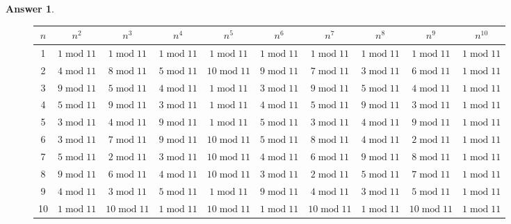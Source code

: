 \documentclass[article, 12pt]{article}
\theoremstyle{definition}
\newtheorem{answer}{Answer}
\newcommand{\Mod}[1]{\;\mathrm{mod}\; #1} %
\begin{document}
\begin{answer}
\begin{figure}[H]
{\begin{tabular}{|c|c|c|c|c|c|c|c|c|c|}
                $n$ & $n^2$ & $n^3$ & $n^4$ & $n^5$ & $n^6$ & $n^7$ & $n^8$ & $n^9$ & $n^{10}$ \\
                \hline
                1 & $1 \Mod {11}$ & $1 \Mod {11}$ & $1 \Mod {11}$ & $1 \Mod {11}$ & $1 \Mod {11}$ & $1 \Mod {11}$ & $1 \Mod {11}$ & $1 \Mod {11}$ & $1 \Mod {11}$ \\
                2 & $4 \Mod {11}$ & $8 \Mod {11}$ & $5 \Mod {11}$ & $10 \Mod {11}$ & $9 \Mod {11}$ & $7 \Mod {11}$ & $3 \Mod {11}$ & $6 \Mod {11}$ & $1 \Mod {11}$ \\
                3 & $9 \Mod {11}$ & $5 \Mod {11}$ & $4 \Mod {11}$ & $1 \Mod {11}$ & $3 \Mod {11}$ & $9 \Mod {11}$ & $5 \Mod {11}$ & $4 \Mod {11}$ & $1 \Mod {11}$ \\
                4 & $5 \Mod {11}$ & $9 \Mod {11}$ & $3 \Mod {11}$ & $1 \Mod {11}$ & $4 \Mod {11}$ & $5 \Mod {11}$ & $9 \Mod {11}$ & $3 \Mod {11}$ & $1 \Mod {11}$ \\
                5 & $3 \Mod {11}$ & $4 \Mod {11}$ & $9 \Mod {11}$ & $1 \Mod {11}$ & $5 \Mod {11}$ & $3 \Mod {11}$ & $4 \Mod {11}$ & $9 \Mod {11}$ & $1 \Mod {11}$ \\
                6 & $3 \Mod {11}$ & $7 \Mod {11}$ & $9 \Mod {11}$ & $10 \Mod {11}$ & $5 \Mod {11}$ & $8 \Mod {11}$ & $4 \Mod {11}$ & $2 \Mod {11}$ & $1 \Mod {11}$ \\
                7 & $5 \Mod {11}$ & $2 \Mod {11}$ & $3 \Mod {11}$ & $10 \Mod {11}$ & $4 \Mod {11}$ & $6 \Mod {11}$ & $9 \Mod {11}$ & $8 \Mod {11}$ & $1 \Mod {11}$ \\
                8 & $9 \Mod {11}$ & $6 \Mod {11}$ & $4 \Mod {11}$ & $10 \Mod {11}$ & $3 \Mod {11}$ & $2 \Mod {11}$ & $5 \Mod {11}$ & $7 \Mod {11}$ & $1 \Mod {11}$ \\
                9 & $4 \Mod {11}$ & $3 \Mod {11}$ & $5 \Mod {11}$ & $1 \Mod {11}$ & $9 \Mod {11}$ & $4 \Mod {11}$ & $3 \Mod {11}$ & $5 \Mod {11}$ & $1 \Mod {11}$ \\
                10 & $1 \Mod {11}$ & $10 \Mod {11}$ & $1 \Mod {11}$ & $10 \Mod {11}$ & $1 \Mod {11}$ & $10 \Mod {11}$ & $1 \Mod {11}$ & $10 \Mod {11}$ & $1 \Mod {11}$ \\
                \hline
            \end{tabular}}
        \end{figure}

        \begin{figure}[H]
            \centering
            \resizebox{\columnwidth}{!}{%

}
\end{figure}
\end{answer}
\end{document}
